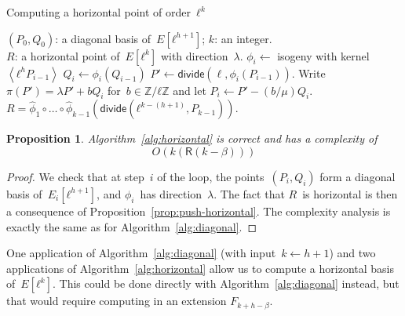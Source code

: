 \documentclass{lms}
\newtheorem{prop}[thm]{Proposition}
\def\pa#1{\left(#1\right)}
\def\chev#1{\left\langle#1\right\rangle}
\def\cout#1{\mathsf{#1}}
\begin{document}
\begin{algorithm}
\caption{\label{alg:horizontal}Computing a horizontal point of order~$ℓ^k$}
\begin{algorithmic}[1]
\REQUIRE $(P_0, Q_0)$: a diagonal basis of~$E[ℓ^{h+1}]$; $k$: an integer.\\
\ENSURE $R$: a horizontal point of~$E[ℓ^k]$ with direction~$λ$.
\STATE $ϕ_i \gets $ isogeny with kernel~$\chev{ℓ^{h} P_{i-1}}$
\STATE $Q_{i} \gets ϕ_i(Q_{i-1})$
\STATE $P' \gets \mathsf{divide}(\ell, ϕ_i(P_{i-1}))$.
\STATE Write~$π(P') = λ P' + b Q_i$ for~$b ∈ ℤ/ℓℤ$ and
let $P_{i} \gets P' - (b/μ) Q_i$.
\ENDFOR
\RETURN $R = \widehat{ϕ}_1 ∘ … ∘ \widehat{ϕ}_{k-1}
  (\mathsf{divide}( ℓ^{k-(h+1)}, P_{k-1}) )$. 
\end{algorithmic}
\end{algorithm}
\begin{prop}
Algorithm~\ref{alg:horizontal} is correct and has a complexity of
\begin{equation*}
O(k(\mathsf{R}(k-\beta)))
\end{equation*}
\end{prop}
\begin{proof}
We check that at step~$i$ of the loop,
the points~$(P_i, Q_i)$ form a diagonal basis of~$E_i[ℓ^{h+1}]$,
and $ϕ_i$~has direction~$λ$.
The fact that $R$~is horizontal is then a consequence
of Proposition~\ref{prop:push-horizontal}.
The complexity analysis %
is exactly the same as for Algorithm~\ref{alg:diagonal}.
\end{proof}

% 
One application of Algorithm~\ref{alg:diagonal} (with input~$k ← h+1$)
and two applications of Algorithm~\ref{alg:horizontal} allow us
to compute a horizontal basis of~$E[ℓ^k]$.
This could be done directly with Algorithm~\ref{alg:diagonal} instead,
but that would require computing in an extension $F_{k+h-\beta}$.
\end{document}
